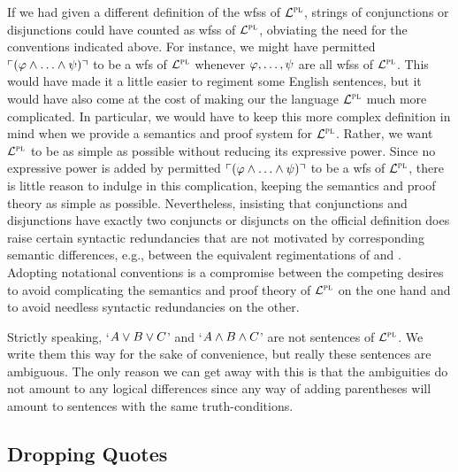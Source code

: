 If we had given a different definition of the wfss of $\mathcal{L}^{\textsc{pl}}$, strings of conjunctions or disjunctions could have counted as wfss of $\mathcal{L}^{\textsc{pl}}$, obviating the need for the conventions indicated above.
For instance, we might have permitted $\ulcorner(\varphi \wedge \ldots \wedge \psi)\urcorner$ to be a wfs of $\mathcal{L}^{\textsc{pl}}$ whenever $\varphi, \ldots, \psi$ are all wfss of $\mathcal{L}^{\textsc{pl}}$.
This would have made it a little easier to regiment some English sentences, but it would have also come at the cost of making our the language $\mathcal{L}^{\textsc{pl}}$ much more complicated.
In particular, we would have to keep this more complex definition in mind when we provide a semantics and proof system for $\mathcal{L}^{\textsc{pl}}$.
Rather, we want $\mathcal{L}^{\textsc{pl}}$ to be as simple as possible without reducing its expressive power.
Since no expressive power is added by permitted $\ulcorner(\varphi \wedge \ldots \wedge \psi)\urcorner$ to be a wfs of $\mathcal{L}^{\textsc{pl}}$, there is little reason to indulge in this complication, keeping the semantics and proof theory as simple as possible.
Nevertheless, insisting that conjunctions and disjunctions have exactly two conjuncts or disjuncts on the official definition does raise certain syntactic redundancies that are not motivated by corresponding semantic differences, e.g., between the equivalent regimentations of  and .
Adopting notational conventions is a compromise between the competing desires to avoid complicating the semantics and proof theory of $\mathcal{L}^{\textsc{pl}}$ on the one hand and to avoid needless syntactic redundancies on the other.



Strictly speaking, `$A \vee B \vee C$' and `$A \wedge B \wedge C$' are not sentences of $\mathcal{L}^{\textsc{pl}}$.
We write them this way for the sake of convenience, but really these sentences are ambiguous.
The only reason we can get away with this is that the ambiguities do not amount to any logical differences since any way of adding parentheses will amount to sentences with the same truth-conditions.




\subsection{Dropping Quotes}
  \label{sub.DropQuote}

